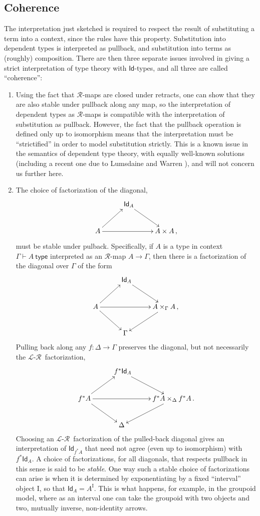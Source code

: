 \documentclass[12pt]{article}
\renewcommand{\L}{\ensuremath{\mathcal{L}}}
\newcommand{\R}{\ensuremath{\mathcal{R}}}
\newcommand{\arr}{\ensuremath{\rightarrow}}
\newcommand{\I}{\ensuremath{\mathrm{I}}}
\newcommand{\G}{\ensuremath{\Gamma}}
\newcommand{\type}{\mathsf{type}}
\newcommand{\types}[2]{#1 \vdash #2\ \type}
\newcommand{\Gtypes}[1]{\types{\Gamma}{#1}}
\newcommand{\Id}{\ensuremath{\mathsf{Id}}}
\newcommand{\id}[1]{\Id_{#1}}
\theoremstyle{remark}
\theoremstyle{definition}
\begin{document}
\subsection{Coherence}

The interpretation just sketched is required to respect the result of substituting a term into a context, since the rules have this property.  Substitution into dependent types is interpreted as pullback, and substitution into terms as (roughly) composition. There are then three separate issues involved in giving a strict interpretation of type theory with \Id-types, and all three are called ``coherence'':

\begin{enumerate}

\item Using the fact that \R-maps are closed under retracts, one can show that they are also stable under pullback along any map, so the interpretation of dependent types as \R-maps is compatible with the interpretation of substitution as pullback.  However, the fact that the pullback operation is defined only up to isomorphism means that the interpretation must be ``strictified'' in order to model substitution strictly.  This is a known issue in the semantics of dependent type theory, with equally well-known solutions (including a recent one due to Lumsdaine and Warren \cite{LW}), and will not concern us further here.

\item The choice of factorization of the diagonal,
\[
\xymatrix{
& \ \id{A} \ar[rd] &\\
A \ar[rr] \ar[ru] && A\times A\,,
}
\]
must be stable under pulback.  Specifically, if $A$ is a type in context $\Gtypes{A}$ interpreted as an \R-map $A\arr\G$, then there is a factorization of the diagonal over $\G$ of the form
\[
\xymatrix{
& \ \id{A} \ar[rd] &\\
A \ar[rr] \ar[ru] \ar[rd] && \ar[ld] A\times_{\G} A\,,\\
& \G &
}
\]
Pulling back along any $f : \Delta \to \G$ preserves the diagonal, but not necessarily the \L-\R\ factorization, 
\[
\xymatrix{
& \ f^*\id{A} \ar[rd] &\\
f^*A \ar[rr] \ar[ru] \ar[rd] && \ar[ld] f^*A\times_{\Delta} f^*A\,.\\
& \Delta &
}
\]
Choosing an \L-\R\ factorization of the pulled-back diagonal gives an interpretation of $\id{f^*A}$ that need not agree (even up to isomorphism) with $f^*\id{A}$.  A choice of factorizations, for all diagonals, that respects pullback in this sense is said to be \emph{stable}.  One way such a stable choice of factorizations can arise is when it is determined by exponentiating by a fixed ``interval'' object $\I$, so that $ \id{A}=A^\I$. This is what happens, for example, in the groupoid model, where as an interval one can take the groupoid with two objects and two, mutually inverse, non-identity arrows.


\end{enumerate}
\end{document}
